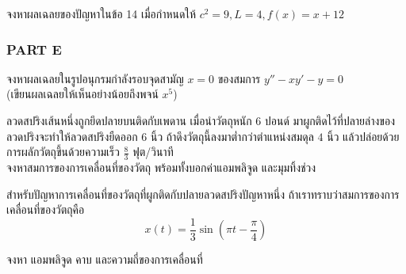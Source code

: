 \documentclass[12pt,final]{novelette} %
\begin{document}
\begin{question}[resume]


    \item {}
    จงหาผลเฉลยของปัญหาในข้อ 14 เมื่อกำหนดให้ $c^2 = 9, L = 4, f(x) = x + 12$ 


\end{question}

\subsubsection*{PART E}

\begin{question}[resume]
    \item {}
    จงหาผลเฉลยในรูปอนุกรมกำลังรอบจุดสามัญ $x = 0$ ของสมการ $y'' - xy' - y = 0$ \\
    (เขียนผลเฉลยให้เห็นอย่างน้อยถึงพจน์ $x^5$) 



    \item {}
    ลวดสปริงเส้นหนึ่งถูกยึดปลายบนติดกับเพดาน
    เมื่อนำวัตถุหนัก $6$ ปอนด์ มาผูกติดไว้ที่ปลายล่างของลวดปริงจะทำให้ลวดสปริงยืดออก $6$ นิ้ว
    ถ้าดึงวัตถุนี้ลงมาต่ำกว่าตำแหน่งสมดุล $4$ นิ้ว แล้วปล่อยด้วยการผลักวัตถุขึ้นด้วยความเร็ว $\frac83$ ฟุต/วินาที \\
    จงหาสมการของการเคลื่อนที่ของวัตถุ พร้อมทั้งบอกค่าแอมพลิจูด และมุมทิ้งช่วง 



    \item {}
    สำหรับปัญหาการเคลื่อนที่ของวัตถุที่ผูกติดกับปลายลวดสปริงปัญหาหนึ่ง
    ถ้าเราทราบว่าสมการของการเคลื่อนที่ของวัตถุคือ
    $$
        x(t) = \frac13 \sin\left(\pi t - \frac\pi4\right)
    $$
    \begin{question}
        \item
        จงหา แอมพลิจูด คาบ และความถี่ของการเคลื่อนที่ 




\end{question}
\end{question}
\end{document}
